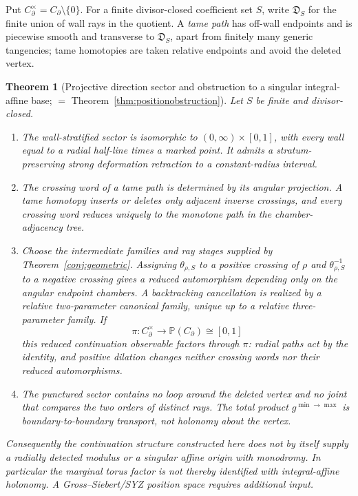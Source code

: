 \documentclass[11pt]{amsart}
\newtheorem{theorem}{Theorem}[section]
\theoremstyle{definition}
\theoremstyle{remark}
\newcommand{\Dscr}{\mathfrak{D}}
\begin{document}
Put $C_\partial^\times=C_\partial\setminus\{0\}$.  For a finite
divisor-closed coefficient set $S$, write $\Dscr_S$ for the finite union of
wall rays in the quotient.  A \emph{tame path} has off-wall endpoints and is
piecewise smooth and transverse to $\Dscr_S$, apart from finitely many generic
tangencies; tame homotopies are taken relative endpoints and avoid the deleted
vertex.

\begin{theorem}[Projective direction sector and obstruction to a singular
  integral-affine base;
  $=$ Theorem~\ref{thm:positionobstruction}]
\label{thm:positionobstruction7}
Let $S$ be finite and divisor-closed.
\begin{enumerate}
\item The wall-stratified sector is isomorphic to
$(0,\infty)\times[0,1]$, with every wall equal to a radial half-line times a
marked point.  It admits a stratum-preserving strong deformation retraction to
a constant-radius interval.
\item The crossing word of a tame path is determined by its angular
projection.  A tame homotopy inserts or deletes only adjacent inverse
crossings, and every crossing word reduces uniquely to the monotone path in
the chamber-adjacency tree.
\item Choose the intermediate families and ray stages supplied by
Theorem~\ref{conj:geometric}.  Assigning $\theta_{\rho,S}$ to a positive
crossing of $\rho$ and $\theta_{\rho,S}^{-1}$ to a negative crossing gives a
reduced automorphism depending only on the angular endpoint chambers.  A
backtracking cancellation is realized by a relative two-parameter canonical
family, unique up to a relative three-parameter family.  If
\[
 \pi:C_\partial^\times\longrightarrow\mathbb P(C_\partial)\cong[0,1]
\]
this reduced continuation observable factors through $\pi$: radial paths act
by the identity, and positive dilation changes neither crossing words nor
their reduced automorphisms.
\item The punctured sector contains no loop around the deleted vertex and no
joint that compares the two orders of distinct rays.  The total product
$g^{\min\to\max}$ is boundary-to-boundary transport, not holonomy about the
vertex.
\end{enumerate}
Consequently the continuation structure constructed here does not by itself
supply a radially detected modulus or a singular affine origin with monodromy.
In particular the marginal torus factor is not thereby identified with
integral-affine holonomy.  A Gross--Siebert/SYZ position space requires
additional input.
\end{theorem}
\end{document}
